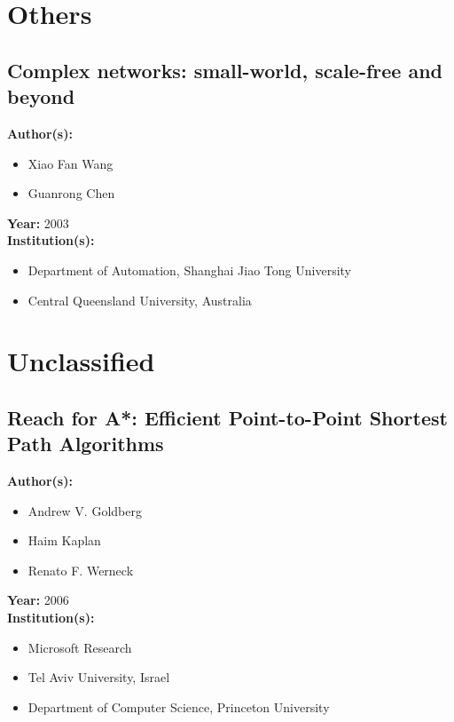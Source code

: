\documentclass[a4paper]{article}
\newenvironment{itemizesp}
{
    \begin{itemize}
}
{
    \end{itemize}
}
\newcommand{\textbff}[1]{{\large \textbf{#1}}}
\begin{document}
    \pagebreak
    \section{Others}

        \subsection{Complex networks: small-world, scale-free and beyond}
        \label{subsec:complexnetw}

        \textbff{Author(s): }
        \begin{itemizesp}
            \item Xiao Fan Wang
            \item Guanrong Chen
        \end{itemizesp}
        \textbff{Year: }2003 \\
        \textbff{Institution(s): }
        \begin{itemizesp}
            \item Department of Automation, Shanghai Jiao Tong University
            \item Central Queensland University, Australia
        \end{itemizesp}

    \pagebreak
    \section{Unclassified}

        \subsection{Reach for A*: Efficient Point-to-Point Shortest Path Algorithms}
        \label{subsec:reachforastar}

        \textbff{Author(s): }
        \begin{itemizesp}
            \item Andrew V. Goldberg
            \item Haim Kaplan
            \item Renato F. Werneck
        \end{itemizesp}
        \textbff{Year: }2006 \\
        \textbff{Institution(s): }
        \begin{itemizesp}
            \item Microsoft Research
            \item Tel Aviv University, Israel
            \item Department of Computer Science, Princeton University
        \end{itemizesp}
\end{document}
